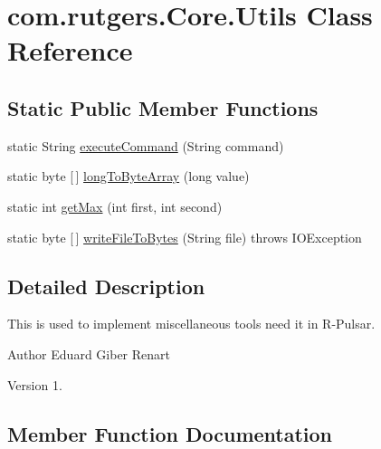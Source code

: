 \hypertarget{classcom_1_1rutgers_1_1Core_1_1Utils}{}\section{com.\+rutgers.\+Core.\+Utils Class Reference}
\label{classcom_1_1rutgers_1_1Core_1_1Utils}
\subsection*{Static Public Member Functions}
\begin{DoxyCompactItemize}
\item 
static String \hyperlink{classcom_1_1rutgers_1_1Core_1_1Utils_aedb9187bb0ecf964d125b300774e98d2}{execute\+Command} (String command)
\item 
static byte \mbox{[}$\,$\mbox{]} \hyperlink{classcom_1_1rutgers_1_1Core_1_1Utils_a24dd8f1b7d7608b660646f798c477089}{long\+To\+Byte\+Array} (long value)
\item 
static int \hyperlink{classcom_1_1rutgers_1_1Core_1_1Utils_a052366fc4a329698e13f6c6633467a98}{get\+Max} (int first, int second)
\item 
static byte \mbox{[}$\,$\mbox{]} \hyperlink{classcom_1_1rutgers_1_1Core_1_1Utils_a56a1cd6f67c4f6387826bf38adf6e82f}{write\+File\+To\+Bytes} (String file)  throws I\+O\+Exception 
\end{DoxyCompactItemize}


\subsection{Detailed Description}
This is used to implement miscellaneous tools need it in R-\/\+Pulsar.

\begin{DoxyAuthor}{Author}
Eduard Giber Renart 
\end{DoxyAuthor}
\begin{DoxyVersion}{Version}
1. 
\end{DoxyVersion}


\subsection{Member Function Documentation}
\mbox{\label{classcom_1_1rutgers_1_1Core_1_1Utils_aedb9187bb0ecf964d125b300774e98d2}} 
